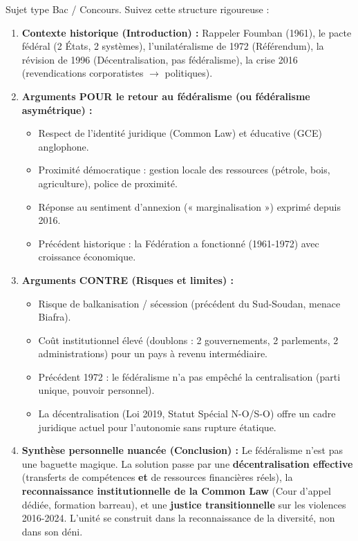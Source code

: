 \documentclass[11pt]{article}
\begin{document}
\begin{methode}
Sujet type Bac / Concours. Suivez cette structure rigoureuse :
\begin{enumerate}
    \item \textbf{Contexte historique (Introduction) :} Rappeler Foumban (1961), le pacte fédéral (2 États, 2 systèmes), l'unilatéralisme de 1972 (Référendum), la révision de 1996 (Décentralisation, pas fédéralisme), la crise 2016 (revendications corporatistes $\to$ politiques).
    \item \textbf{Arguments POUR le retour au fédéralisme (ou fédéralisme asymétrique) :}
    \begin{itemize}
        \item Respect de l'identité juridique (Common Law) et éducative (GCE) anglophone.
        \item Proximité démocratique : gestion locale des ressources (pétrole, bois, agriculture), police de proximité.
        \item Réponse au sentiment d'annexion (« marginalisation ») exprimé depuis 2016.
        \item Précédent historique : la Fédération a fonctionné (1961-1972) avec croissance économique.
    \end{itemize}
    \item \textbf{Arguments CONTRE (Risques et limites) :}
    \begin{itemize}
        \item Risque de balkanisation / sécession (précédent du Sud-Soudan, menace Biafra).
        \item Coût institutionnel élevé (doublons : 2 gouvernements, 2 parlements, 2 administrations) pour un pays à revenu intermédiaire.
        \item Précédent 1972 : le fédéralisme n'a pas empêché la centralisation (parti unique, pouvoir personnel).
        \item La décentralisation (Loi 2019, Statut Spécial N-O/S-O) offre un cadre juridique actuel pour l'autonomie sans rupture étatique.
    \end{itemize}
    \item \textbf{Synthèse personnelle nuancée (Conclusion) :} Le fédéralisme n'est pas une baguette magique. La solution passe par une \textbf{décentralisation effective} (transferts de compétences \textbf{et} de ressources financières réels), la \textbf{reconnaissance institutionnelle de la Common Law} (Cour d'appel dédiée, formation barreau), et une \textbf{justice transitionnelle} sur les violences 2016-2024. L'unité se construit dans la reconnaissance de la diversité, non dans son déni.
\end{enumerate}
\end{methode}
\end{document}

